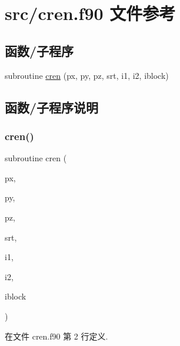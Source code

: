 \hypertarget{cren_8f90}{}\section{src/cren.f90 文件参考}
\label{cren_8f90}
\subsection*{函数/子程序}
\begin{DoxyCompactItemize}
\item 
subroutine \mbox{\hyperlink{cren_8f90_a6d1de3f2c087987dd12031298f5e3b6a}{cren}} (px, py, pz, srt, i1, i2, iblock)
\end{DoxyCompactItemize}


\subsection{函数/子程序说明}
\mbox{\label{cren_8f90_a6d1de3f2c087987dd12031298f5e3b6a}} 
\subsubsection{\texorpdfstring{cren()}{cren()}}
{\footnotesize\ttfamily subroutine cren (\begin{DoxyParamCaption}\item[{}]{px,  }\item[{}]{py,  }\item[{}]{pz,  }\item[{}]{srt,  }\item[{}]{i1,  }\item[{}]{i2,  }\item[{}]{iblock }\end{DoxyParamCaption})}



在文件 cren.\+f90 第 2 行定义.

